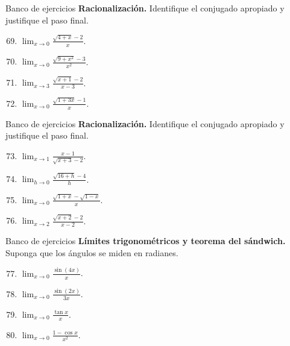 \documentclass[12pt,aspectratio=169]{beamer}
\begin{document}
\begin{frame}[t,allowframebreaks]{Banco de ejercicios}
\small
\noindent \textbf{Racionalización.} Identifique el conjugado apropiado y justifique el paso final.\par\smallskip
\begin{enumerate}\setcounter{enumi}{68}
\item $\displaystyle\lim_{x\to0}\frac{\sqrt{4+x}-2}{x}$.
\item $\displaystyle\lim_{x\to0}\frac{\sqrt{9+x^2}-3}{x^2}$.
\item $\displaystyle\lim_{x\to3}\frac{\sqrt{x+1}-2}{x-3}$.
\item $\displaystyle\lim_{x\to0}\frac{\sqrt{1+3x}-1}{x}$.
\end{enumerate}
\end{frame}


\begin{frame}[t,allowframebreaks]{Banco de ejercicios}
\small
\noindent \textbf{Racionalización.} Identifique el conjugado apropiado y justifique el paso final.\par\smallskip
\begin{enumerate}\setcounter{enumi}{72}
\item $\displaystyle\lim_{x\to1}\frac{x-1}{\sqrt{x+3}-2}$.
\item $\displaystyle\lim_{h\to0}\frac{\sqrt{16+h}-4}{h}$.
\item $\displaystyle\lim_{x\to0}\frac{\sqrt{1+x}-\sqrt{1-x}}{x}$.
\item $\displaystyle\lim_{x\to2}\frac{\sqrt{x+2}-2}{x-2}$.
\end{enumerate}
\end{frame}


\begin{frame}[t,allowframebreaks]{Banco de ejercicios}
\small
\noindent \textbf{Límites trigonométricos y teorema del sándwich.} Suponga que los ángulos se miden en radianes.\par\smallskip
\begin{enumerate}\setcounter{enumi}{76}
\item $\displaystyle\lim_{x\to0}\frac{\sin(4x)}{x}$.
\item $\displaystyle\lim_{x\to0}\frac{\sin(2x)}{3x}$.
\item $\displaystyle\lim_{x\to0}\frac{\tan x}{x}$.
\item $\displaystyle\lim_{x\to0}\frac{1-\cos x}{x^2}$.
\end{enumerate}
\end{frame}
\end{document}
